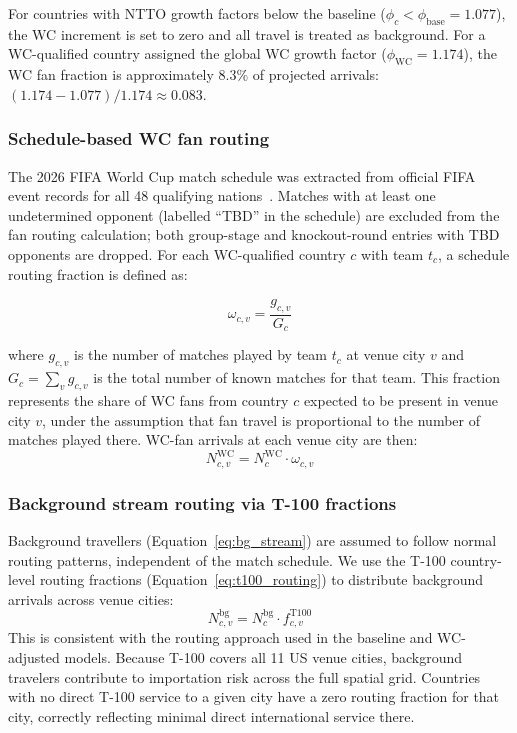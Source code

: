 \documentclass[12pt]{article}
\begin{document}
For countries with NTTO growth factors below the baseline
($\phi_c < \phi_{\text{base}} = 1.077$), the WC increment is set to
zero and all travel is treated as background. For a WC-qualified
country assigned the global WC growth factor
($\phi_{\text{WC}} = 1.174$), the WC fan fraction is approximately
$8.3\%$ of projected arrivals:
$(1.174 - 1.077)/1.174 \approx 0.083$.

\subsubsection*{Schedule-based WC fan routing}

The 2026 FIFA World Cup match schedule was extracted from official
FIFA event records for all 48 qualifying nations~\cite{FIFA2026_schedule}. Matches with at least one undetermined opponent
(labelled ``TBD'' in the schedule) are excluded from the fan routing
calculation; both group-stage and knockout-round entries with TBD
opponents are dropped. For each WC-qualified country $c$ with team $t_c$, a
schedule routing fraction is defined as:

\begin{equation}
  \omega_{c,v} = \frac{g_{c,v}}{G_c}
  \label{eq:schedule_routing}
\end{equation}

where $g_{c,v}$ is the number of matches played by team $t_c$ at venue
city $v$ and $G_c = \sum_v g_{c,v}$ is the total number of known
matches for that team. This fraction represents the share of WC fans
from country $c$ expected to be present in venue city $v$, under the
assumption that fan travel is proportional to the number of matches
played there. WC-fan arrivals at each venue city are then:
\begin{equation}
  N_{c,v}^{\text{WC}} = N_c^{\text{WC}} \cdot \omega_{c,v}
  \label{eq:wc_arrivals_venue}
\end{equation}

\subsubsection*{Background stream routing via T-100 fractions}

Background travellers (Equation~\ref{eq:bg_stream}) are assumed to
follow normal routing patterns, independent of the match schedule.
We use the T-100 country-level routing fractions
(Equation~\ref{eq:t100_routing}) to distribute background arrivals
across venue cities:
\begin{equation}
  N_{c,v}^{\text{bg}} = N_c^{\text{bg}} \cdot f_{c,v}^{\text{T100}}
  \label{eq:bg_arrivals}
\end{equation}
This is consistent with the routing approach used in the baseline
and WC-adjusted models. Because T-100 covers all 11 US venue cities,
background travelers contribute to importation risk across the full
spatial grid. Countries with no direct T-100 service to a given city
have a zero routing fraction for that city, correctly reflecting
minimal direct international service there.
\end{document}
